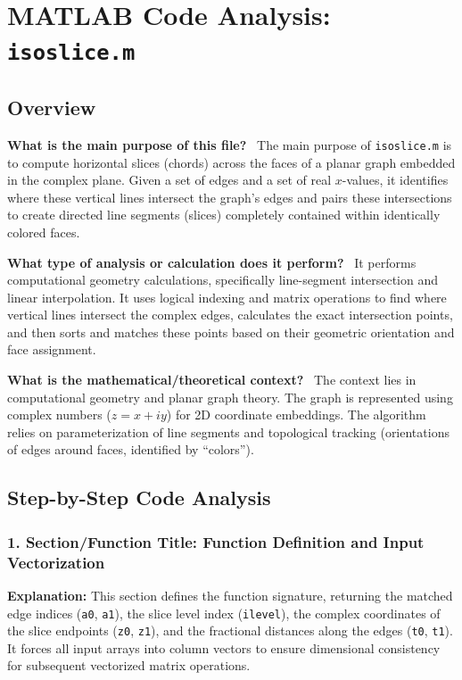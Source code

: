 \chapter{MATLAB Code Analysis: \texttt{isoslice.m}}
\date{}


\maketitle

\section{Overview}

\textbf{What is the main purpose of this file?} \
The main purpose of \texttt{isoslice.m} is to compute horizontal slices (chords) across the faces of a planar graph embedded in the complex plane. Given a set of edges and a set of real $x$-values, it identifies where these vertical lines intersect the graph's edges and pairs these intersections to create directed line segments (slices) completely contained within identically colored faces.

\textbf{What type of analysis or calculation does it perform?} \
It performs computational geometry calculations, specifically line-segment intersection and linear interpolation. It uses logical indexing and matrix operations to find where vertical lines intersect the complex edges, calculates the exact intersection points, and then sorts and matches these points based on their geometric orientation and face assignment.

\textbf{What is the mathematical/theoretical context?} \
The context lies in computational geometry and planar graph theory. The graph is represented using complex numbers ($z = x + iy$) for 2D coordinate embeddings. The algorithm relies on parameterization of line segments and topological tracking (orientations of edges around faces, identified by ``colors'').

\section{Step-by-Step Code Analysis}

\subsection*{1. Section/Function Title: Function Definition and Input Vectorization}
\textbf{Explanation:} This section defines the function signature, returning the matched edge indices (\texttt{a0}, \texttt{a1}), the slice level index (\texttt{ilevel}), the complex coordinates of the slice endpoints (\texttt{z0}, \texttt{z1}), and the fractional distances along the edges (\texttt{t0}, \texttt{t1}). It forces all input arrays into column vectors to ensure dimensional consistency for subsequent vectorized matrix operations.

